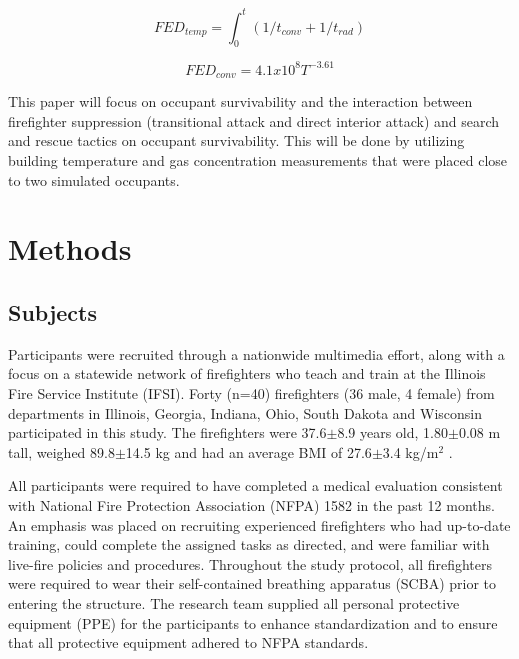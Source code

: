 \documentclass[12pt,oneside]{article}
\begin{document}


\begin{equation}\label{eqn:temp_cum}FED_{temp}=\int_{0}^{t}(1/t_{conv}+1/t_{rad})\end{equation}

\begin{equation}\label{eqn:FED_temp}FED_{conv}=4.1x10^8{T^{-3.61}}\end{equation}

This paper will focus on occupant survivability and the interaction between firefighter suppression (transitional attack and direct interior attack) and search and rescue tactics on occupant survivability.  This will be done by utilizing building temperature and gas concentration measurements that were placed close to two simulated occupants.  

\section{Methods}
\label{sec:methods}

\subsection{Subjects}
\label{subsec:subjects}

Participants were recruited through a nationwide multimedia effort, along with a focus on a statewide network of firefighters who teach and train at the Illinois Fire Service Institute (IFSI). Forty (n=40) firefighters (36 male, 4 female) from departments in Illinois, Georgia, Indiana, Ohio, South Dakota and Wisconsin participated in this study. The firefighters were 37.6$\pm$8.9 years old, 1.80$\pm$0.08 m tall, weighed 89.8$\pm$14.5 kg and had an average BMI of 27.6$\pm$3.4 kg/m$^2$ \cite{Horn:Ergonomics}.

All participants were required to have completed a medical evaluation consistent with National Fire Protection Association (NFPA) 1582 \cite{NFPA_1582} in the past 12 months. An emphasis was placed on recruiting  experienced firefighters who had up-to-date training, could complete the assigned tasks as directed, and were familiar with live-fire policies and procedures. Throughout the study protocol, all firefighters were required to wear their self-contained breathing apparatus (SCBA) prior to entering the structure. The research team supplied all personal protective equipment (PPE) for the participants to enhance standardization and to ensure that all protective equipment adhered to NFPA standards.
\end{document}
